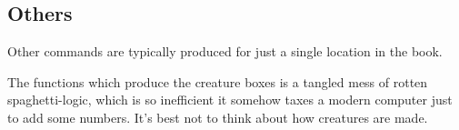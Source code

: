 \documentclass[a4paper,openany]{book}
\begin{document}
\begin{multicols}{2}

\section{Others}

Other commands are typically produced for just a single location in the book.

The functions which produce the creature boxes is a tangled mess of rotten spaghetti-logic, which is so inefficient it somehow taxes a modern computer just to add some numbers.
It's best not to think about how creatures are made.

\end{multicols}
\end{document}
